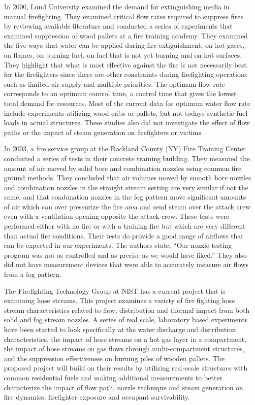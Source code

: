 \documentclass{article}
\begin{document}
In 2000, Lund University examined the demand for extinguishing media in manual firefighting. They examined critical flow rates required to suppress fires by reviewing available literature and conducted a series of experiments that examined suppression of wood pallets at a fire training academy. They examined the five ways that water can be applied during fire extiguishment, on hot gases, on flames, on burning fuel, on fuel that is not yet burning and on hot surfaces. They highlight that what is most effective against the fire is not necessarily best for the firefighters since there are other constraints during firefighting operations such as limited air supply and multiple priorities. The optimum flow rate corresponds to an optimum control time, a control time that gives the lowest total demand for resources. Most of the current data for optimum water flow rate include experiments utilizing wood cribs or pallets, but not todays synthetic fuel loads in actual structures.  These studies also did not investigate the effect of flow paths or the impact of steam generation on firefighters or victims.

In 2003, a fire service group at the Rockland County (NY) Fire Training Center conducted a series of tests in their concrete training building. They measured the amount of air moved by solid bore and combination nozzles using common fire ground methods. They concluded that air volumes moved by smooth bore nozzles and combination nozzles in the straight stream setting are very similar if not the same, and that combination nozzles in the fog pattern move significant amounts of air which can over pressurize the fire area and send steam over the attack crew even with a ventilation opening opposite the attack crew. These tests were performed either with no fire or with a training fire but which are very different than actual fire conditions. Their tests do provide a good range of airflows that can be expected in our experiments. The authors state, “Our nozzle testing program was not as controlled and as precise as we would have liked.” They also did not have measurement devices that were able to accurately measure air flows from a fog pattern.  

The Firefighting Technology Group at NIST has a current project that is examining hose streams. This project examines a variety of fire fighting hose stream characteristics related to flow, distribution and thermal impact from both solid and fog stream nozzles. A series of real scale, laboratory based experiments have been started to look specifically at the water discharge and distribution characteristics, the impact of hose streams on a hot gas layer in a compartment, the impact of hose streams on gas flows through multi-compartment structures, and the suppression effectiveness on burning piles of wooden pallets. The proposed project will build on their results by utilizing real-scale structures with common residential fuels and making additional measurements to better characterize the impact of flow path, nozzle technique and steam generation on fire dynamics, firefighter exposure and occupant survivability.
\end{document}
